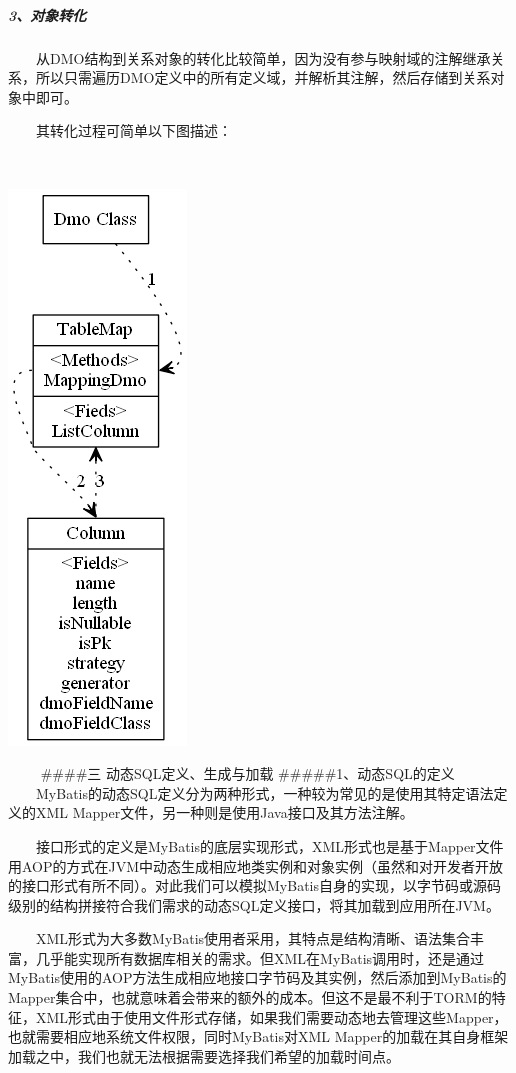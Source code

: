 \documentclass[]{article}
\begin{document}
\subparagraph{3、对象转化}\label{ux5bf9ux8c61ux8f6cux5316}

　　从DMO结构到关系对象的转化比较简单，因为没有参与映射域的注解继承关系，所以只需遍历DMO定义中的所有定义域，并解析其注解，然后存储到关系对象中即可。

　　其转化过程可简单以下图描述：

　　

\includegraphics{diagram/dmoanalyze.png}

　　 \#\#\#\#三 动态SQL定义、生成与加载 \#\#\#\#\#1、动态SQL的定义
　　MyBatis的动态SQL定义分为两种形式，一种较为常见的是使用其特定语法定义的XML
Mapper文件，另一种则是使用Java接口及其方法注解。

　　接口形式的定义是MyBatis的底层实现形式，XML形式也是基于Mapper文件用AOP的方式在JVM中动态生成相应地类实例和对象实例（虽然和对开发者开放的接口形式有所不同）。对此我们可以模拟MyBatis自身的实现，以字节码或源码级别的结构拼接符合我们需求的动态SQL定义接口，将其加载到应用所在JVM。

　　XML形式为大多数MyBatis使用者采用，其特点是结构清晰、语法集合丰富，几乎能实现所有数据库相关的需求。但XML在MyBatis调用时，还是通过MyBatis使用的AOP方法生成相应地接口字节码及其实例，然后添加到MyBatis的Mapper集合中，也就意味着会带来的额外的成本。但这不是最不利于TORM的特征，XML形式由于使用文件形式存储，如果我们需要动态地去管理这些Mapper，也就需要相应地系统文件权限，同时MyBatis对XML
Mapper的加载在其自身框架加载之中，我们也就无法根据需要选择我们希望的加载时间点。
\end{document}
